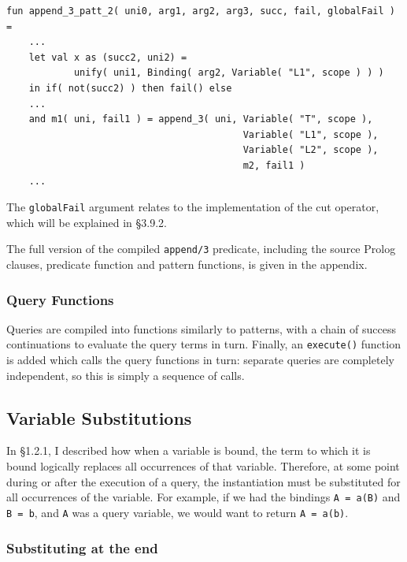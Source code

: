 \documentclass[12pt]{article}
\begin{document}
\begin{verbatim}
fun append_3_patt_2( uni0, arg1, arg2, arg3, succ, fail, globalFail ) = 
    ...
    let val x as (succ2, uni2) = 
            unify( uni1, Binding( arg2, Variable( "L1", scope ) ) )
    in if( not(succ2) ) then fail() else
    ...
    and m1( uni, fail1 ) = append_3( uni, Variable( "T", scope ), 
                                          Variable( "L1", scope ), 
                                          Variable( "L2", scope ), 
                                          m2, fail1 )
    ...
\end{verbatim}

The \verb|globalFail| argument relates to the implementation of the cut operator, which will be explained in \S3.9.2.

The full version of the compiled \verb|append/3| predicate, including the source Prolog clauses, predicate function and pattern functions, is given in the appendix.


\subsubsection{Query Functions}

Queries are compiled into functions similarly to patterns, with a chain of success continuations to evaluate the query terms in turn. 
Finally, an \verb|execute()| function is added which calls the query functions in turn: separate queries are completely independent, so this is simply a sequence of calls.

\subsection{Variable Substitutions}

In \S1.2.1, I described how when a variable is bound, the term to which it is bound logically replaces all occurrences of that variable. 
Therefore, at some point during or after the execution of a query, the instantiation must be substituted for all occurrences of the variable. 
For example, if we had the bindings \verb|A = a(B)| and \verb|B = b|, and \verb|A| was a query variable, we would want to return \verb|A = a(b)|.

\subsubsection{Substituting at the end}
\end{document}
